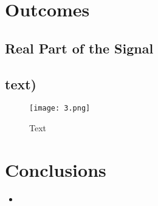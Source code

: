 \documentclass[12pt]{article}
\begin{document}
\newpage
\section{Outcomes}


\subsection{Real Part of the Signal}

\vfill
\newpage
\subsection{text)}
\begin{figure}[htbp]
    \centering
    \texttt{[image: 3.png]}
    \caption{Text}
    \label{fig:text}
\end{figure}

\FloatBarrier
\vfill


\newpage

\section{Conclusions}

\begin{itemize}
    \item 
\end{itemize}
\end{document}
